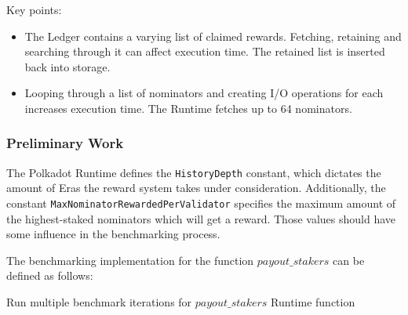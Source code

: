 \documentclass[11pt,a4paper]{article}
\begin{document}
Key points:

\begin{itemize}
  \item The Ledger contains a varying list of claimed rewards. Fetching,
  retaining and searching through it can affect execution time. The retained
  list is inserted back into storage.
  \item Looping through a list of nominators and creating I/O operations for
  each increases execution time. The Runtime fetches up to 64 nominators.
\end{itemize}

\subsubsection{Preliminary Work}

The Polkadot Runtime defines the \verb|HistoryDepth| constant, which dictates
the amount of Eras the reward system takes under consideration. Additionally,
the constant \verb|MaxNominatorRewardedPerValidator| specifies the maximum
amount of the highest-staked nominators which will get a reward. Those values
should have some influence in the benchmarking process.
\newline

The benchmarking implementation for the function $payout\_stakers$ can be
defined as follows:
\newline

\begin{algorithm}[H]
  \caption{Run multiple benchmark iterations for $payout\_stakers$ Runtime function}
  \SetAlgoLined
  \BlankLine
\end{algorithm}
\end{document}
